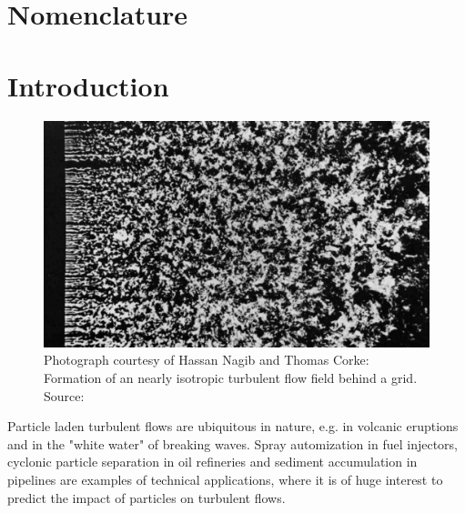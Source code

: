 \documentclass[11pt,a4paper,openany,oneside,parskip=half*]{article}
\begin{document}
\makenomenclature %


\renewcommand{\refname}{}
\renewcommand{\nomname}{}



\setlength{\columnsep}{30pt}
\setlength{\parindent}{0pt}

\pagebreak
\tableofcontents{} %
\thispagestyle{empty}
\pagebreak

\renewcommand{\thesection}{\Roman{section}}

\section{Nomenclature}
\printnomenclature
\pagebreak
\renewcommand{\thesection}{\arabic{section}}
\setcounter{section}{0}
\section{Introduction}
\setcounter{page}{1}
\begin{figure}[h]
	\centering
  \includegraphics[width=\textwidth]{./Abbildungen/TurbulentMotion_Introduction.png}
  \captionsetup{width=0.97\linewidth}
	\caption{Photograph courtesy of Hassan Nagib and Thomas Corke: Formation of an nearly isotropic turbulent flow field behind a grid. Source: \cite{albumOfTurbulentMotion}}
	\label{introduction_picture}
\end{figure}
Particle laden turbulent flows are ubiquitous in nature, e.g. in volcanic eruptions and in the "white water" of breaking waves.
Spray automization in fuel injectors, cyclonic particle separation in oil refineries and sediment accumulation in pipelines are examples of technical applications, where it is of huge interest to predict the impact of particles on turbulent flows.
\end{document}
